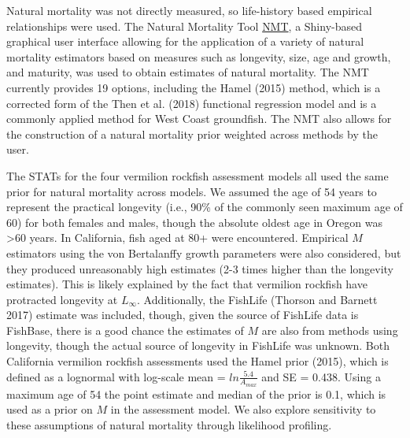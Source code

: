 \documentclass[11pt,
  english,
]{article}
\begin{document}
\leavevmode\tagmcend\tagstructend

Natural mortality was not directly measured, so life-history based empirical relationships were used. The Natural Mortality Tool {\href{https://github.com/shcaba/Natural-Mortality-Tool}{NMT}\leavevmode\tagmcend\tagstructend}, a Shiny-based graphical user interface allowing for the application of a variety of natural mortality estimators based on measures such as longevity, size, age and growth, and maturity, was used to obtain estimates of natural mortality. The NMT currently provides 19 options, including the Hamel {(2015)\leavevmode\tagmcend\tagstructend} method, which is a corrected form of the Then et al. {(2018)\leavevmode\tagmcend\tagstructend} functional regression model and is a commonly applied method for West Coast groundfish. The NMT also allows for the construction of a natural mortality prior weighted across methods by the user.

The STATs for the four vermilion rockfish assessment models all used the same prior for natural mortality across models. We assumed the age of 54 years to represent the practical longevity (i.e., 90\% of the commonly seen maximum age of 60) for both females and males, though the absolute oldest age in Oregon was \textgreater60 years. In California, fish aged at 80+ were encountered. Empirical {\(M\)\leavevmode\tagmcend\tagstructend} estimators using the von Bertalanffy growth parameters were also considered, but they produced unreasonably high estimates (2-3 times higher than the longevity estimates). This is likely explained by the fact that vermilion rockfish have protracted longevity at {\(L_{\infty}\)\leavevmode\tagmcend\tagstructend}. Additionally, the FishLife {(Thorson and Barnett 2017)\leavevmode\tagmcend\tagstructend} estimate was included, though, given the source of FishLife data is FishBase, there is a good chance the estimates of {\(M\)\leavevmode\tagmcend\tagstructend} are also from methods using longevity, though the actual source of longevity in FishLife was unknown. Both California vermilion rockfish assessments used the Hamel prior {(2015)\leavevmode\tagmcend\tagstructend}, which is defined as a lognormal with log-scale mean = {\(ln\frac{5.4}{A_{max}}\)\leavevmode\tagmcend\tagstructend} and SE = 0.438. Using a maximum age of 54 the point estimate and median of the prior is 0.1, which is used as a prior on {\(M\)\leavevmode\tagmcend\tagstructend} in the assessment model. We also explore sensitivity to these assumptions of natural mortality through likelihood profiling.
\end{document}

